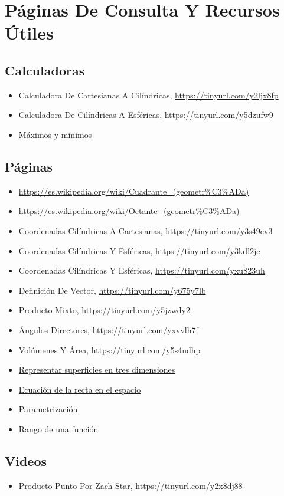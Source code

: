 \documentclass{article}
\begin{document}
\section{Páginas De Consulta Y Recursos Útiles}
\label{sec:org4794084}
\subsection{Calculadoras}
\label{sec:org8fb442d}
\begin{itemize}
\item Calculadora De Cartesianas A Cilíndricas, \url{https://tinyurl.com/y2ljx8fp}
\item Calculadora De Cilíndricas A Esféricas, \url{https://tinyurl.com/y5dzufw9}
\item \href{https://www.wolframalpha.com/widgets/view.jsp?id=537159240ca725f712f6c7437d2f3e0c}{Máximos y mínimos}
\end{itemize}

\subsection{Páginas}
\label{sec:orgd6cf71a}
\begin{itemize}
\item \url{https://es.wikipedia.org/wiki/Cuadrante\_(geometr\%C3\%ADa)}
\item \url{https://es.wikipedia.org/wiki/Octante\_(geometr\%C3\%ADa)}
\item Coordenadas Cilíndricas A Cartesianas, \url{https://tinyurl.com/y3s49cv3}
\item Coordenadas Cilíndricas Y Esféricas, \url{https://tinyurl.com/y3kdl2jc}
\item Coordenadas Cilíndricas Y Esféricas, \url{https://tinyurl.com/yxu823uh}
\item Definición De Vector, \url{https://tinyurl.com/y675y7lb}
\item Producto Mixto, \url{https://tinyurl.com/y5jzwdy2}
\item Ángulos Directores, \url{https://tinyurl.com/yxvvlh7f}
\item Volúmenes Y Área, \url{https://tinyurl.com/y5s4udhp}
\item \href{https://www.gaussianos.com/representar-superficies-en-tres-dimensiones/}{Representar superficies en tres dimensiones}
\item \href{https://www.superprof.es/apuntes/escolar/matematicas/analitica/recta/ecuaciones-de-la-recta-en-el-espacio.html\#tema\_ecuacion-continua-de-la-recta}{Ecuación de la recta en el espacio}
\item \href{https://personales.unican.es/alvareze/CalculoWeb/CalculoII/apuntes/curvasParametricas.pdf}{Parametrización}
\item \href{https://blog.unitips.mx/dominio-y-rango-de-funciones}{Rango de una función}
\end{itemize}

\subsection{Videos}
\label{sec:orgd9eaedb}
\begin{itemize}
\item Producto Punto Por Zach Star, \url{https://tinyurl.com/y2x8dj88}
\end{itemize}
\end{document}
